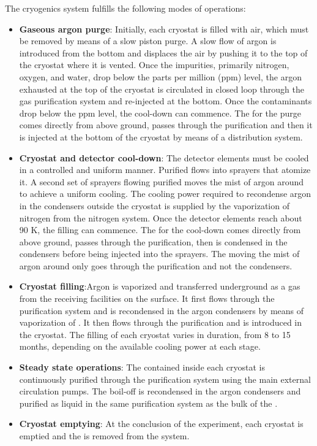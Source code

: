 The cryogenics system fulfills the following modes of operations:
\begin{itemize}
  \item {\bf Gaseous argon purge}: Initially, each cryostat is filled
    with air, which must be removed by means of a slow  piston
    purge.  A slow flow of argon is introduced from the bottom and
    displaces the air by pushing it to the top of the cryostat where
    it is vented.  Once the impurities, primarily nitrogen, oxygen, and 
    water, drop below the parts per million (ppm) level, the argon
    exhausted at the top of the cryostat is circulated in closed loop
    through the gas purification system and re-injected at the
    bottom. Once the contaminants drop below the ppm level, the
    cool-down can commence. The  for the purge comes directly from
    above ground, passes through the  purification and then it is
    injected at the bottom of the cryostat by means of a 
    distribution system.
  \item {\bf Cryostat and detector cool-down}: The detector elements
    must be cooled in a controlled and uniform manner. Purified 
    flows into sprayers that atomize it. A second set of sprayers
    flowing purified  moves the mist of argon around to achieve a
    uniform cooling. The cooling power required to recondense argon in
    the condensers outside the cryostat is supplied by the
    vaporization of nitrogen from the nitrogen system. Once the
    detector elements reach about 90 K, the filling can commence. The
     for the cool-down comes directly from above ground, passes
    through the  purification,  then is condensed in the
    condensers before being injected into the sprayers. The  moving
    the mist of argon around only goes through the  purification
    and not the condensers.
  \item {\bf Cryostat filling}:Argon is vaporized and transferred
    underground as a gas from the receiving facilities on the surface.
    It first flows through the  purification system and is
    recondensed in the argon condensers by means of vaporization of
    .  It then flows through the  purification and is introduced
    in the cryostat. The filling of each cryostat varies in duration,
    from 8 to 15 months, depending on the available cooling power at
    each stage.
  \item{\bf Steady state operations}: The  contained inside each
    cryostat is continuously purified through the  purification
    system using the main external  circulation pumps. The boil-off
     is recondensed in the argon condensers and purified as liquid
    in the same  purification system as the bulk of the .
  \item{\bf Cryostat emptying}: At the conclusion of the experiment,
    each cryostat is emptied and the  is removed from the system.
\end{itemize}
